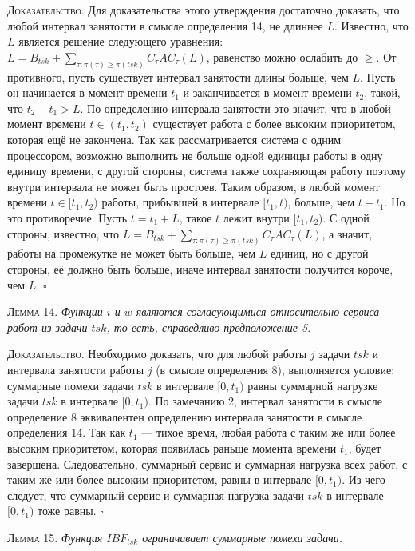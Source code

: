 \documentclass[14pt]{matmex-diploma-custom}
\begin{document}
\textsc{Доказательство.}  Для доказательства этого утверждения достаточно доказать, 
  что любой интервал занятости в смысле определения 14, не длиннее $L$. 
  Известно, что $L$ является решение следующего уравнения: 
    $L = B_{tsk} + \sum_{\tau: \pi(\tau) \geq \pi(tsk)} C_{\tau}AC_{\tau}(L)$, 
    равенство можно ослабить до $\geq$.
  От противного, пусть существует интервал занятости длины больше, чем $L$. Пусть он 
    начинается в момент времени $t_1$ и заканчивается в момент времени $t_2$, такой, что $t_2 - t_1 > L$.
  По определению интервала занятости это значит, что в любой момент времени $t \in (t_1, t_2)$
    существует работа с более высоким приоритетом, которая ещё не закончена.
  Так как рассматривается система с одним процессором, возможно выполнить не больше одной  
    единицы работы в одну единицу времени, с другой стороны, система также сохраняющая работу
    поэтому внутри интервала не может быть простоев. 
  Таким образом, в любой момент времени $t \in [t_1, t_2)$ работы, прибывшей в интервале 
    $[t_1, t)$, больше, чем $t - t_1$.
  Но это противоречие. Пусть $t = t_1 + L$, такое $t$ лежит внутри $[t_1, t_2)$. 
    С одной стороны, известно, что $L = B_{tsk} + \sum_{\tau: \pi(\tau) \geq \pi(tsk)} C_{\tau}AC_{\tau}(L)$, 
      а значит, работы на промежутке не может быть больше, чем $L$ единиц, 
    но с другой стороны, её должно быть больше, иначе интервал занятости получится короче, чем $L$. 
$\square$


\textsc{Лемма 14.}
\textit{Функции $i$ и $w$ являются согласующимися относительно сервиса 
  работ из задачи $tsk$, то есть, справедливо предположение 5. }

\textsc{Доказательство.}  Необходимо доказать, что для любой работы $j$ задачи $tsk$ 
  и интервала занятости работы $j$ (в смысле определения 8), выполняется условие: 
    суммарные помехи задачи $tsk$ в интервале $[0, t_1)$ 
    равны суммарной нагрузке задачи $tsk$ в интервале $[0, t_1)$. 
  По замечанию 2, интервал занятости в смысле определение 8 эквивалентен 
    определению интервала занятости в смысле определения 14. 
  Так как $t_1$ --- тихое время, любая работа с таким же или более высоким приоритетом, 
    которая появилась раньше момента времени $t_1$, будет завершена. 
  Следовательно, суммарный сервис и суммарная нагрузка всех работ, с таким же или 
    более высоким приоритетом, равны в интервале $[0, t_1)$.    
  Из чего следует, что суммарный сервис и суммарная нагрузка задачи $tsk$
    в интервале $[0, t_1)$ тоже равны. $\square$


\textsc{Лемма 15.}
\textit{Функция $IBF_{tsk}$ ограничивает суммарные помехи задачи. }
\end{document}

